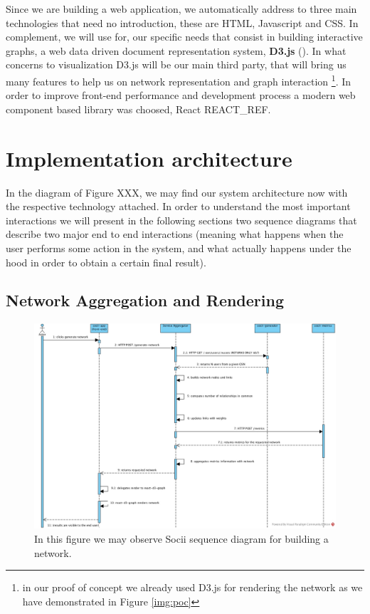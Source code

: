 Since we are building a web application, we automatically address to three main technologies that need no introduction, these are HTML, Javascript and CSS. In complement, we will use for, our specific needs that consist in building interactive graphs, a web data driven document representation system, \textbf{D3.js} (\cite{bostock2012d3}). In what concerns to visualization D3.js will be our main third party, that will bring us many features to help us on network representation and graph interaction \footnote{in our proof of concept we already used D3.js for rendering the network as we have demonstrated in Figure \ref{img:poc}}. In order to improve front-end performance and development process a modern web component based library was choosed, React REACT\_REF.

\section{Implementation architecture}

In the diagram of Figure XXX, we may find our system architecture now with the respective technology attached. In order to understand the most important interactions we will present in the following sections two sequence diagrams that describe two major end to end interactions (meaning what happens when the user performs some action in the system, and what actually happens under the hood in order to obtain a certain final result).

\subsection{Network Aggregation and Rendering}

\begin{figure}[h!]
\begin{center}
  \hspace*{-0.8in}
  \includegraphics[width=1.2\textwidth]{img/socii-sd.jpg}
\end{center}
\caption{\label{img:sociisd} In this figure we may observe Socii sequence diagram for building a network.}
\end{figure}


